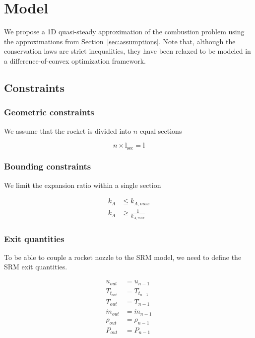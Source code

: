 \section{Model}

We propose a 1D quasi-steady approximation of the combustion problem
using the approximations from Section~\ref{sec:assumptions}. Note
that, although the conservation laws are strict inequalities,
they have been relaxed to be modeled in a difference-of-convex
optimization framework.


\subsection{Constraints}

\subsubsection{Geometric constraints}

We assume that the rocket is divided into $n$ equal sections

\begin{equation}
    n \times \mathrm{l_{sec}} = \mathrm{l}
\end{equation}


\subsubsection{Bounding constraints}


We limit the expansion ratio within a single section

\begin{align}
    k_A &\leq k_{A,max} \\
    k_A &\geq \frac{1}{k_{A,max}}
\end{align}

\subsubsection{Exit quantities}

To be able to couple a rocket nozzle to the SRM model,
we need to define the SRM exit quantities.

\begin{align}
    u_{out} &= u_{n-1} \\
    T_{t_{out}} &= T_{t_{n-1}} \\
    T_{out} &= T_{n-1} \\
    \dot{m}_{out} &= \dot{m}_{n-1} \\
    \rho_{out} &= \rho_{n-1} \\
    P_{out} &= P_{n-1}
\end{align}

